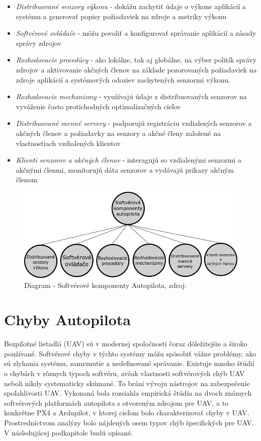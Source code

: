 \documentclass[10pt,twoside,slovak,a4paper]{article}
\begin{document}
\begin{itemize}
\item \emph{Distribuované senzory výkonu} - dokážu zachytiť údaje o výkone aplikácií a systému a generovať popisy požiadaviek na zdroje a metriky výkonu
\item \emph{Softvérové ovládače} - môžu povoliť a konfigurovať správanie aplikácií a zásady správy zdrojov
\item \emph{Rozhodovacie procedúry} - ako lokálne, tak aj globálne, na výber politík správy zdrojov a aktivovanie akčných členov na základe pozorovaných požiadaviek na zdroje aplikácií a systémových odoziev zachytených senzormi výkonu.
\item \emph{Rozhodovacie mechanizmy} - využívajú údaje z distribuovaných senzorov na vyváženie často protichodných optimalizačných cieľov
\item \emph{Distribuované menné servery} - podporujú registráciu vzdialených senzorov a akčných členov a požiadavky na senzory a akčné členy založené na vlastnostiach vzdialených klientov
\item \emph{Klienti senzorov a akčných členov} - interagujú so vzdialenými senzormi a akčnými členmi, monitorujú dáta senzorov a vydávajú príkazy akčným členom \cite{SoftverAutopilot}
\end{itemize}

\begin{figure}[tbh]
\centering
\includegraphics[scale=0.40]{diagram.png}
\caption{Diagram - Softvérové komponenty Autopilota, zdroj:\cite{SoftverAutopilot}}
\label{f:diagram}
\end{figure}

\section{Chyby Autopilota} \label{chyby}

Bezpilotné lietadlá (UAV) sú v modernej spoločnosti čoraz dôležitejšie a široko používané. Softvérové chyby v týchto systémy môžu spôsobiť vážne problémy, ako sú zlyhania systému, zamrznutie a nedefinované správanie. Existuje mnoho štúdií o chybách v rôznych typoch softvéru, avšak vlastnosti softvérových chýb UAV neboli nikdy systematicky skúmané. To bráni vývoju nástrojov na zabezpečenie spoľahlivosti UAV. Vykonaná bola rozsiahla empirická štúdia na dvoch známych softvérových platformách autopilota s otvoreným zdrojom pre UAV, a to konkrétne PX4 a Ardupilot, v ktorej cieľom bolo charakterizovať chyby v UAV. Prostredníctvom analýzy bolo nájdených osem typov chýb špecifických pre UAV. V následujúcej podkapitole budú opísané.\cite{chybyautopilot}
\end{document}
